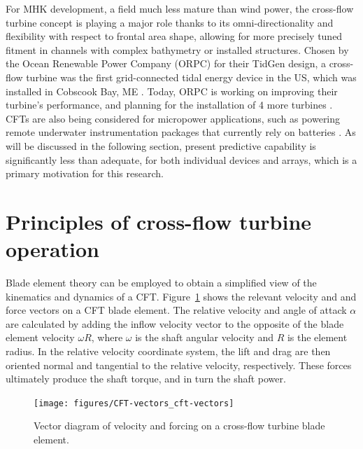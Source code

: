 For MHK development, a field much less mature than wind power, the cross-flow
turbine concept is playing a major role thanks to its omni-directionality and
flexibility with respect to frontal area shape, allowing for more precisely
tuned fitment in channels with complex bathymetry or installed structures.
Chosen by the Ocean Renewable Power Company (ORPC) for their TidGen design, a
cross-flow turbine was the first grid-connected tidal energy device in the US,
which was installed in Cobscook Bay, ME \cite{ORPC2012}. Today, ORPC is working
on improving their turbine's performance, and planning for the installation of 4
more turbines \cite{Nelson2013}. CFTs are also being considered for micropower
applications, such as powering remote underwater instrumentation packages that
currently rely on batteries \cite{Polagye2013b}. As will be discussed in the
following section, present predictive capability is significantly less than
adequate, for both individual devices and arrays, which is a primary motivation
for this research.




\section{Principles of cross-flow turbine operation}

Blade element theory can be employed to obtain a simplified view of the
kinematics and dynamics of a CFT. Figure~\ref{fig:vectors} shows the relevant
velocity and and force vectors on a CFT blade element. The relative velocity and
angle of attack $\alpha$ are calculated by adding the inflow velocity vector to
the opposite of the blade element velocity $\omega R$, where $\omega$ is the
shaft angular velocity and $R$ is the element radius. In the relative velocity
coordinate system, the lift and drag are then oriented normal and tangential to
the relative velocity, respectively. These forces ultimately produce the shaft
torque, and in turn the shaft power. 

\begin{figure}[ht]
    \centering
    
    \texttt{[image: figures/CFT-vectors\_cft-vectors]}
    
    \caption{Vector diagram of velocity and forcing on a cross-flow turbine
        blade element.}
    
    \label{fig:vectors}
\end{figure}

